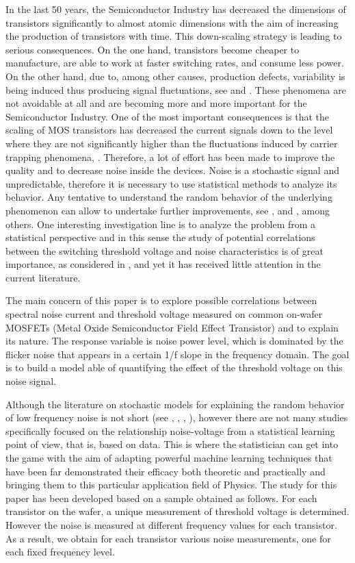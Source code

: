 \documentclass[sn-mathphys]{sn-jnl}%
\theoremstyle{thmstyleone}%
\theoremstyle{thmstyletwo}%
\theoremstyle{thmstylethree}%
\begin{document}
In the last 50 years, the Semiconductor Industry has decreased the dimensions of transistors significantly to almost atomic dimensions with the aim of increasing the production of transistors with time. This down-scaling strategy is leading to serious consequences. On the one hand, transistors become cheaper to manufacture, are able to work at faster switching rates, and consume less power. On the other hand, due to, among other causes, production defects, variability is being induced thus producing signal fluctuations, see \cite{Schroder2006} and \cite{Tsividis1998}. These phenomena are not avoidable at all and are becoming more and more important for the Semiconductor Industry. One of the most important consequences is that the  scaling of MOS transistors has decreased the current signals down to the level where they are not significantly higher than the fluctuations induced by carrier trapping phenomena, \cite{RMGRO2016}.  Therefore, a lot of effort has been made to improve the quality and to decrease noise inside the devices. Noise is a stochastic signal and unpredictable, therefore it is necessary to use statistical methods to analyze its behavior. Any tentative to understand the random behavior of the underlying phenomenon can allow to undertake further improvements, see \cite{Tetal2015}, \cite{Betal2016} and \cite{Betal2020}, among others. One interesting investigation line is to analyze the problem from a statistical perspective and in this sense the study of potential correlations between the switching threshold voltage and noise characteristics is of great importance, as considered in \cite{Duty2016}, and yet it has received little attention in the current literature.

The main concern of this paper is to explore possible correlations between spectral noise current and threshold voltage measured on common on-wafer MOSFETs (Metal Oxide Semiconductor Field Effect Transistor) and to explain its nature. The response variable is noise power level, which is dominated by the flicker noise that appears in a certain 1/f slope in the frequency domain. The goal is to build a model able of quantifying the effect of the threshold voltage on this noise signal. 

Although the literature on stochastic models for explaining the random behavior of low frequency noise is not short (see \cite{Petal2019}, \cite{WK2020}, \cite{Betal2016}, \cite{Betal2020}), however there are not many studies specifically focused on the relationship noise-voltage from a statistical learning point of view, that is, based on data. This is where the statistician can get into the game with the aim of adapting powerful machine learning techniques that have  been far demonstrated their efficacy both theoretic and practically and bringing them to this particular application field of Physics. The study for this paper has been developed  based on a sample obtained as follows. For each transistor on the wafer, a unique measurement of threshold voltage is determined. However the noise is measured at different frequency values for each transistor. As a result, we obtain for each transistor various noise measurements, one for each fixed frequency level. 
\end{document}
